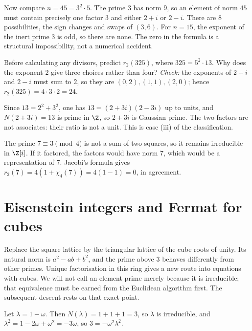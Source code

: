 Now compare $n=45=3^2\cdot5$. The prime $3$ has norm $9$, so an element of norm
$45$ must contain precisely one factor $3$ and either $2+i$ or $2-i$.
There are $8$ possibilities, the sign changes and swaps of $(3,6)$.
For $n=15$, the exponent of the inert prime $3$ is odd, so there are none.
The zero in the formula is a structural impossibility, not a numerical accident.

\begin{think}
Before calculating any divisors, predict $r_2(325)$, where $325=5^2\cdot13$.
Why does the exponent $2$ give three choices rather than four?
\emph{Check:} the exponents of $2+i$ and $2-i$ must sum to $2$, so they are
$(0,2),(1,1),(2,0)$; hence $r_2(325)=4\cdot3\cdot2=24$.
\end{think}

\begin{examplex}[factoring $13$]
Since $13=2^2+3^2$, one has $13=(2+3i)(2-3i)$ up to units, and $N(2+3i)=13$ is prime in $\Z$, so $2+3i$ is Gaussian prime. The two factors are not associates: their ratio is not a unit. This is case (iii) of the classification.
\end{examplex}

\begin{examplex}
The prime $7\equiv 3\pmod 4$ is not a sum of two squares, so it remains irreducible in $\Z[i]$. If it factored, the factors would have norm $7$, which would be a representation of $7$. Jacobi's formula gives $r_2(7)=4(1+\chi_4(7))=4(1-1)=0$, in agreement.
\end{examplex}

\section{Eisenstein integers and Fermat for cubes}

Replace the square lattice by the triangular lattice of the cube roots of unity. Its natural norm is $a^2-ab+b^2$, and the prime above $3$ behaves differently from other primes. Unique factorisation in this ring gives a new route into equations with cubes. We will not call an element prime merely because it is irreducible; that equivalence must be earned from the Euclidean algorithm first. The subsequent descent rests on that exact point.

Let $\lambda=1-\omega$. Then $N(\lambda)=1+1+1=3$, so $\lambda$ is irreducible, and $\lambda^2=1-2\omega+\omega^2=-3\omega$, so $3=-\omega^2\lambda^2$.

